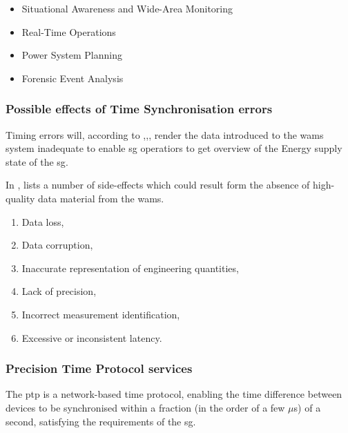 \begin{itemize}
    \item  Situational Awareness and Wide-Area Monitoring
    \item  Real-Time Operations
    \item  Power System Planning 
    \item  Forensic Event Analysis
    
\end{itemize}

\subsubsection{Possible effects of Time Synchronisation errors}
Timing errors will, according to ,,, render the data introduced to the \acrshort{wams} system inadequate to enable \acrshort{sg} operatiors to get overview of the Energy supply state of the \acrshort{sg}.

In \Cite{martin2019impact}, \citeauthor{martin2019impact} lists a number of side-effects which could result form the absence of high-quality data material from the \acrshort{wams}.


\begin{enumerate}




    \item Data loss,
    \item Data corruption,
    \item Inaccurate representation of engineering quantities,
    \item Lack of precision,
    \item Incorrect measurement identification,
    \item Excessive or inconsistent latency.

\end{enumerate}

\subsubsection{Precision Time Protocol services}
The \acrfull{ptp} is a network-based time protocol, enabling the time difference between devices to be synchronised within a fraction (in the order of a few $\mu$s) of a second, satisfying the requirements of the \acrshort{sg}. 


